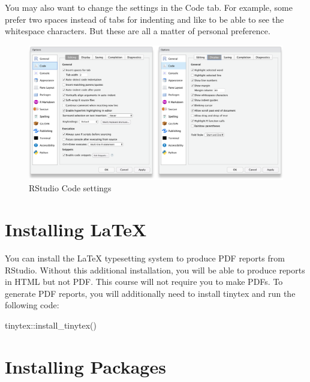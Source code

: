 \documentclass[
  oneside]{book}
\newenvironment{Shaded}{\begin{snugshade}}{\end{snugshade}}
\newcommand{\FunctionTok}[1]{\textcolor[rgb]{0.00,0.00,0.00}{#1}}
\newcommand{\NormalTok}[1]{#1}
\newcommand{\SpecialCharTok}[1]{\textcolor[rgb]{0.00,0.00,0.00}{#1}}
\begin{document}
You may also want to change the settings in the Code tab. For example, some prefer two spaces instead of tabs for indenting and like to be able to see the whitespace characters. But these are all a matter of personal preference.

\begin{figure}

{\centering \includegraphics[width=1\linewidth]{images/appendices/rstudio_settings_code} 

}

\caption{RStudio Code settings}\label{fig:settings-code}
\end{figure}

\hypertarget{installing-latex}{%
\section{Installing LaTeX}\label{installing-latex}}

You can install the LaTeX typesetting system to produce PDF reports from RStudio. Without this additional installation, you will be able to produce reports in HTML but not PDF. This course will not require you to make PDFs. To generate PDF reports, you will additionally need to install tinytex \citep{R-tinytex} and run the following code:

\begin{Shaded}
\begin{Highlighting}[]
\NormalTok{tinytex}\SpecialCharTok{::}\FunctionTok{install\_tinytex}\NormalTok{()}
\end{Highlighting}
\end{Shaded}

\hypertarget{installing-packages}{%
\section{Installing Packages}\label{installing-packages}}
\end{document}
